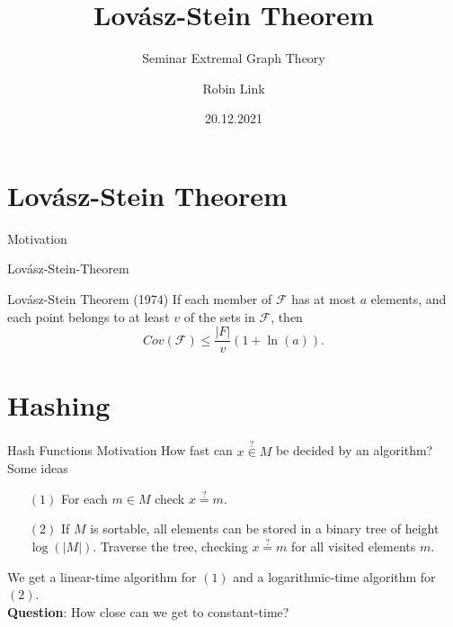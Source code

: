 \documentclass[10pt]{beamer}
\title{Lovász-Stein Theorem}
\subtitle{Seminar Extremal Graph Theory}
\date{20.12.2021}
\institute{Advisors: \newline Prof. Dr. Maria Axenovich \& Dr. Alexander Neal Riasanovsky}
\author{Robin Link}
\begin{document}
\maketitle

\section{Lovász-Stein Theorem}


\begin{frame}[fragile]{Motivation}

\end{frame}


\begin{frame}[fragile]{Lovász-Stein-Theorem}
    \begin{block}{Lovász-Stein Theorem (1974)}
        If each member of $ \mathcal{F} $ has at most $ a $ elements,
        and each point belongs to at least $ v $ of the sets in $ \mathcal{F} $, then
        \[
            Cov(\mathcal{F}) \leq \frac{|F|}{v}(1 + \ln(a)).
        \]
    \end{block}
\end{frame}

\section{Hashing}

\begin{frame}[fragile]{Hash Functions Motivation}
    How fast can $ x \stackrel{?}{\in} M $ be decided by an algorithm? \pause
    \\
    \vspace{1em}
    Some ideas
    \begin{itemize}
        \item[$ (1) $] For each $ m \in M $ check $ x \stackrel{?}{=} m $.\pause
        \item[$ (2) $] If $ M $ is sortable, all elements can be stored in a binary tree of height $ \log (|M|)$.
        Traverse the tree, checking $ x \stackrel{?}{=} m $ for all visited elements $ m $.\pause
    \end{itemize}
    We get a linear-time algorithm for $ (1) $ and a logarithmic-time algorithm for $ (2) $.\pause
    \\
    \vfill
    \textbf{Question}: How close can we get to constant-time?
\end{frame}
\end{document}
